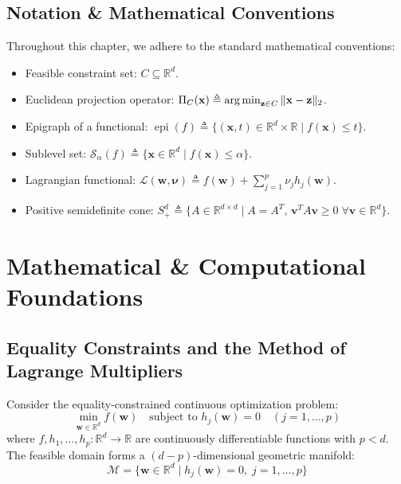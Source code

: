 \subsection{Notation \& Mathematical Conventions}
Throughout this chapter, we adhere to the standard mathematical conventions:
\begin{itemize}
    \item Feasible constraint set: $C \subseteq \mathbb{R}^d$.
    \item Euclidean projection operator: $\Pi_C(\mathbf{x}) \triangleq \operatorname*{arg\,min}_{\mathbf{z} \in C} \|\mathbf{x} - \mathbf{z}\|_2$.
    \item Epigraph of a functional: $\operatorname{epi}(f) \triangleq \{(\mathbf{x}, t) \in \mathbb{R}^d \times \mathbb{R} \mid f(\mathbf{x}) \le t\}$.
    \item Sublevel set: $\mathcal{S}_\alpha(f) \triangleq \{\mathbf{x} \in \mathbb{R}^d \mid f(\mathbf{x}) \le \alpha\}$.
    \item Lagrangian functional: $\mathcal{L}(\mathbf{w}, \boldsymbol{\nu}) \triangleq f(\mathbf{w}) + \sum_{j=1}^p \nu_j h_j(\mathbf{w})$.
    \item Positive semidefinite cone: $S^d_+ \triangleq \{A \in \mathbb{R}^{d \times d} \mid A = A^T, \, \mathbf{v}^T A \mathbf{v} \ge 0 \; \forall \mathbf{v} \in \mathbb{R}^d\}$.
\end{itemize}

\section{Mathematical \& Computational Foundations}

\subsection{Equality Constraints and the Method of Lagrange Multipliers}
Consider the equality-constrained continuous optimization problem:
\begin{equation}
\min_{\mathbf{w} \in \mathbb{R}^d} f(\mathbf{w}) \quad \text{subject to } h_j(\mathbf{w}) = 0 \quad (j = 1, \dots, p)
\label{eq:eq_constrained_prob}
\end{equation}
where $f, h_1, \dots, h_p: \mathbb{R}^d \to \mathbb{R}$ are continuously differentiable functions with $p < d$. The feasible domain forms a $(d - p)$-dimensional geometric manifold:
\begin{equation}
\mathcal{M} = \{\mathbf{w} \in \mathbb{R}^d \mid h_j(\mathbf{w}) = 0, \; j = 1, \dots, p\}
\end{equation}

